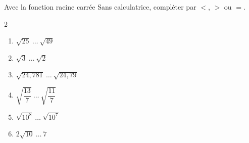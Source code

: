 \begin{exo}{Avec la fonction racine carrée}
	Sans calculatrice, compléter par $<$, $>$ ou $=$.
	\vspace*{-2mm}
	\begin{multicols}{2}
		\begin{enumerate}[itemsep=2mm]
			\item $\sqrt{25} \ \dots \ \sqrt{49}$
			\item $\sqrt{3} \ \dots \ \sqrt{2}$
			\item $\sqrt{24,781} \ \dots \ \sqrt{24,79}$
			\item $\sqrt{\dfrac{13}{7}} \ \dots \ \sqrt{\dfrac{11}{7}}$
			\item $\sqrt{10^8} \ \dots \ \sqrt{10^7}$
			\item $2\sqrt{10} \ \dots \ 7$
		\end{enumerate}
	\end{multicols}\vspace*{-2mm}
\end{exo}
